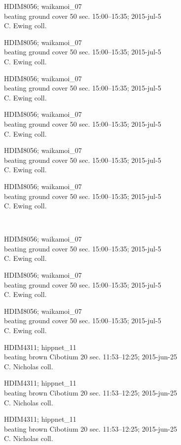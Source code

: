 \documentclass[2pt]{extarticle}
\begin{document}
\noindent
\parbox{0.16\textwidth}{\tiny \raggedright \rule[-0.3\baselineskip]{0pt}{10pt}HDIM8056; waikamoi\_07\\ beating ground cover 50 sec. 15:00--15:35; 2015-jul-5\\ C. Ewing coll.}
\parbox{0.16\textwidth}{\tiny \raggedright \rule[-0.3\baselineskip]{0pt}{10pt}HDIM8056; waikamoi\_07\\ beating ground cover 50 sec. 15:00--15:35; 2015-jul-5\\ C. Ewing coll.}
\parbox{0.16\textwidth}{\tiny \raggedright \rule[-0.3\baselineskip]{0pt}{10pt}HDIM8056; waikamoi\_07\\ beating ground cover 50 sec. 15:00--15:35; 2015-jul-5\\ C. Ewing coll.}
\parbox{0.16\textwidth}{\tiny \raggedright \rule[-0.3\baselineskip]{0pt}{10pt}HDIM8056; waikamoi\_07\\ beating ground cover 50 sec. 15:00--15:35; 2015-jul-5\\ C. Ewing coll.}
\parbox{0.16\textwidth}{\tiny \raggedright \rule[-0.3\baselineskip]{0pt}{10pt}HDIM8056; waikamoi\_07\\ beating ground cover 50 sec. 15:00--15:35; 2015-jul-5\\ C. Ewing coll.}
\parbox{0.16\textwidth}{\tiny \raggedright \rule[-0.3\baselineskip]{0pt}{10pt}HDIM8056; waikamoi\_07\\ beating ground cover 50 sec. 15:00--15:35; 2015-jul-5\\ C. Ewing coll.} \\ 
\vspace{0.001in} 

\noindent
\parbox{0.16\textwidth}{\tiny \raggedright \rule[-0.3\baselineskip]{0pt}{10pt}HDIM8056; waikamoi\_07\\ beating ground cover 50 sec. 15:00--15:35; 2015-jul-5\\ C. Ewing coll.}
\parbox{0.16\textwidth}{\tiny \raggedright \rule[-0.3\baselineskip]{0pt}{10pt}HDIM8056; waikamoi\_07\\ beating ground cover 50 sec. 15:00--15:35; 2015-jul-5\\ C. Ewing coll.}
\parbox{0.16\textwidth}{\tiny \raggedright \rule[-0.3\baselineskip]{0pt}{10pt}HDIM8056; waikamoi\_07\\ beating ground cover 50 sec. 15:00--15:35; 2015-jul-5\\ C. Ewing coll.}
\parbox{0.16\textwidth}{\tiny \raggedright \rule[-0.3\baselineskip]{0pt}{10pt}HDIM4311; hippnet\_11\\ beating brown Cibotium 20 sec. 11:53--12:25; 2015-jun-25\\ C. Nicholas coll.}
\parbox{0.16\textwidth}{\tiny \raggedright \rule[-0.3\baselineskip]{0pt}{10pt}HDIM4311; hippnet\_11\\ beating brown Cibotium 20 sec. 11:53--12:25; 2015-jun-25\\ C. Nicholas coll.}
\parbox{0.16\textwidth}{\tiny \raggedright \rule[-0.3\baselineskip]{0pt}{10pt}HDIM4311; hippnet\_11\\ beating brown Cibotium 20 sec. 11:53--12:25; 2015-jun-25\\ C. Nicholas coll.} \\ 
\vspace{0.001in} 
\end{document}
